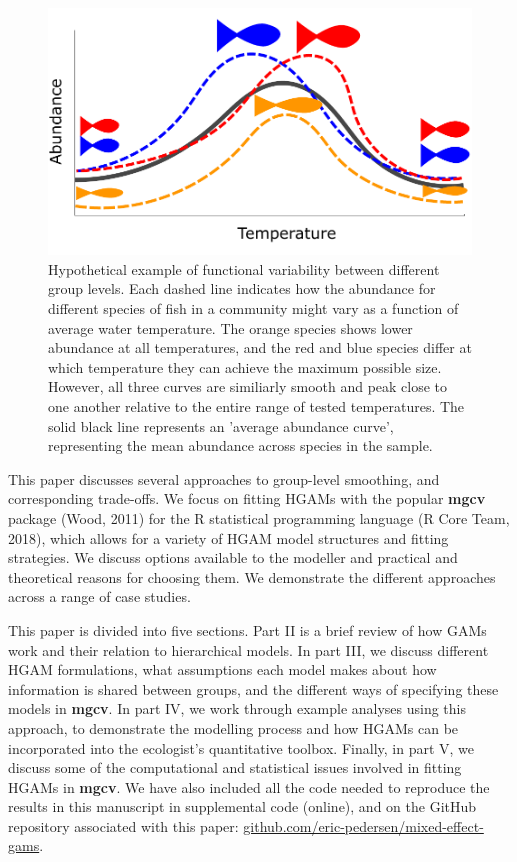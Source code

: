 \documentclass[12pt]{article}
\begin{document}
\begin{figure}

{\centering \includegraphics[width=.6\linewidth]{../figures/temp_growth_example} 

}

\caption{\label{fig:fish_size}Hypothetical example of functional variability between different group levels. Each dashed line indicates how the abundance for different species of fish in a community might vary as a function of average water temperature. The orange species shows lower abundance at all temperatures, and the red and blue species differ at which temperature they can achieve the maximum possible size. However, all three curves are similiarly smooth and peak close to one another relative to the entire range of tested temperatures. The solid black line represents an 'average abundance curve', representing the mean abundance across species in the sample.}\label{fig:fish_size}
\end{figure}

This paper discusses several approaches to group-level smoothing, and
corresponding trade-offs. We focus on fitting HGAMs with the popular
\textbf{mgcv} package (Wood, 2011) for the R statistical programming
language (R Core Team, 2018), which allows for a variety of HGAM model
structures and fitting strategies. We discuss options available to the
modeller and practical and theoretical reasons for choosing them. We
demonstrate the different approaches across a range of case studies.

This paper is divided into five sections. Part II is a brief review of
how GAMs work and their relation to hierarchical models. In part III, we
discuss different HGAM formulations, what assumptions each model makes
about how information is shared between groups, and the different ways
of specifying these models in \textbf{mgcv}. In part IV, we work through
example analyses using this approach, to demonstrate the modelling
process and how HGAMs can be incorporated into the ecologist's
quantitative toolbox. Finally, in part V, we discuss some of the
computational and statistical issues involved in fitting HGAMs in
\textbf{mgcv}. We have also included all the code needed to reproduce
the results in this manuscript in supplemental code (online), and on the
GitHub repository associated with this paper:
\href{http://www.github.com/eric-pedersen/mixed-effect-gams}{github.com/eric-pedersen/mixed-effect-gams}.
\end{document}
